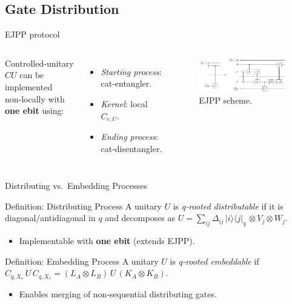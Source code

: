 \documentclass{beamer}
\begin{document}
	\subsection{Gate Distribution}
	\begin{frame}{EJPP protocol}
		\begin{columns}[T]
			Controlled‑unitary \(CU\) can be implemented non‑locally with \textbf{one ebit} using:
			\begin{itemize}
				\item \emph{Starting process}: cat‑entangler.
				\item \emph{Kernel}: local $C_{e,U}$.
				\item \emph{Ending process}: cat‑disentangler.
			\end{itemize}
			\centering
			\begin{figure}
				\includegraphics[width=\linewidth]{figures/EJPP_protocol.pdf}
				\caption{EJPP scheme.}
			\end{figure}
		\end{columns}
	\end{frame}
	\begin{frame}{Distributing vs.~Embedding Processes}
		\begin{block}{Definition: Distributing Process}
			A unitary $U$ is \emph{q‑rooted distributable} if it is diagonal/antidiagonal in $q$ and decomposes as
			$U = \sum_{ij} \Delta_{ij}\,|i\rangle\!\langle j|_q\,\otimes V_j\otimes W_j$.
			\begin{itemize}
				\item Implementable with \textbf{one ebit} (extends EJPP).
			\end{itemize}
		\end{block}
		\vspace{.5em}
		\begin{block}{Definition: Embedding Process}
			A unitary $U$ is \emph{q‑rooted embeddable} if
			$C_{q,X_e}\,U\,C_{q,X_e} = (L_A\otimes L_B)\,U\,(K_A\otimes K_B)$.
			\begin{itemize}
				\item Enables merging of non‑sequential distributing gates.
			\end{itemize}
		\end{block}
	\end{frame}
	
\end{document}
